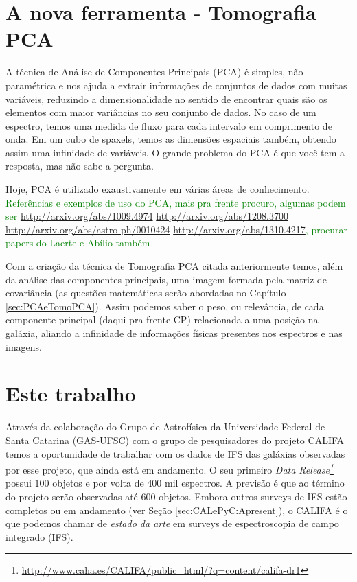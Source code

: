 \section{A nova ferramenta - Tomografia PCA}
\label{sec:Intro:TomoPCA}

A técnica de Análise de Componentes Principais (PCA) é simples, não-paramétrica
e nos ajuda a extrair informações de conjuntos de dados com muitas variáveis,
reduzindo a dimensionalidade no sentido de encontrar quais são os elementos com
maior variâncias no seu conjunto de dados. No caso de um espectro, temos uma
medida de fluxo para cada intervalo em comprimento de onda. Em um cubo de
spaxels, temos as dimensões espaciais também, obtendo assim uma infinidade de
variáveis. O grande problema do PCA é que você tem a resposta, mas não sabe a
pergunta.

Hoje, PCA é utilizado exaustivamente em várias áreas de conhecimento. \ojo
\citneed \textcolor{green}{Referências e exemplos de uso do PCA, mais pra
frente procuro, algumas podem ser 
\url{http://arxiv.org/abs/1009.4974}
\url{http://arxiv.org/abs/1208.3700}
\url{http://arxiv.org/abs/astro-ph/0010424}
\url{http://arxiv.org/abs/1310.4217}, procurar papers do Laerte e Abílio
também}

Com a criação da técnica de Tomografia PCA citada anteriormente temos, além da
análise das componentes principais, uma imagem formada pela matriz de
covariância (as questões matemáticas serão abordadas no Capítulo
\ref{sec:PCAeTomoPCA}). Assim podemos saber o peso, ou relevância, de cada
componente principal (daqui pra frente CP) relacionada a uma posição na galáxia,
aliando a infinidade de informações físicas presentes nos espectros e nas
imagens.

\section{Este trabalho}
\label{sec:Intro:ThisWork}

Através da colaboração do Grupo de Astrofísica da Universidade Federal de Santa
Catarina (GAS-UFSC) com o grupo de pesquisadores do projeto CALIFA temos a
oportunidade de trabalhar com os dados de IFS das galáxias observadas por esse
projeto, que ainda está em andamento. O seu primeiro {\em Data
Release\footnote{\url{http://www.caha.es/CALIFA/public_html/?q=content/califa-dr1}}}
\citep[][DR1]{Husemann2013} possui $100$ objetos e por volta de $400$ mil
espectros. A previsão é que ao término do projeto serão observadas até $600$
objetos. Embora outros surveys de IFS estão completos ou em andamento (ver Seção
\ref{sec:CALePyC:Apresent}), o CALIFA é o que podemos chamar de {\em estado da
arte} em surveys de espectroscopia de campo integrado (IFS).

